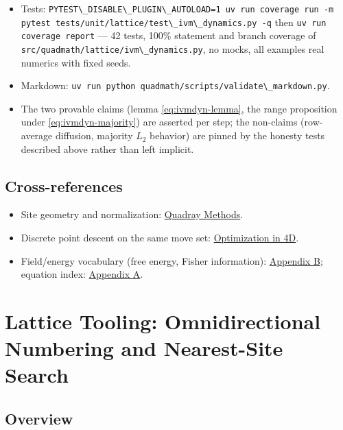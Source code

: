 \documentclass[
  10pt,
]{article}
\newcommand{\passthrough}[1]{#1}
\providecommand{\tightlist}{%
  \setlength{\itemsep}{0pt}\setlength{\parskip}{0pt}}
\begin{document}
\begin{itemize}
\tightlist
\item
  Tests:
  \passthrough{\lstinline!PYTEST\_DISABLE\_PLUGIN\_AUTOLOAD=1 uv run coverage run -m pytest tests/unit/lattice/test\_ivm\_dynamics.py -q!}
  then \passthrough{\lstinline!uv run coverage report!} --- 42 tests,
  100\% statement and branch coverage of
  \passthrough{\lstinline!src/quadmath/lattice/ivm\_dynamics.py!}, no
  mocks, all examples real numerics with fixed seeds.
\item
  Markdown:
  \passthrough{\lstinline!uv run python quadmath/scripts/validate\_markdown.py!}.
\item
  The two provable claims (lemma \eqref{eq:ivmdyn-lemma}, the range
  proposition under \eqref{eq:ivmdyn-majority}) are asserted per step;
  the non-claims (row-average diffusion, majority \(L_2\) behavior) are
  pinned by the honesty tests described above rather than left implicit.
\end{itemize}

\subsection{Cross-references}\label{cross-references-1}

\begin{itemize}
\tightlist
\item
  Site geometry and normalization: \href{03_quadray_methods.md}{Quadray
  Methods}.
\item
  Discrete point descent on the same move set:
  \href{04_optimization_in_4d.md}{Optimization in 4D}.
\item
  Field/energy vocabulary (free energy, Fisher information):
  \href{09_free_energy_active_inference.md}{Appendix B}; equation index:
  \href{08_equations_appendix.md}{Appendix A}.
\end{itemize}

\newpage

\section{Lattice Tooling: Omnidirectional Numbering and Nearest-Site
Search}\label{lattice-tooling-omnidirectional-numbering-and-nearest-site-search}

\subsection{Overview}\label{overview-6}
\end{document}
